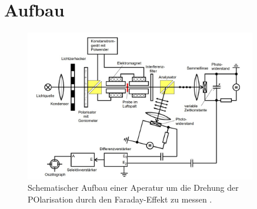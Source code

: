 \section{Aufbau}

\begin{figure}
    \centering
    \includegraphics[width=0.9\textwidth]{bilder/Aufbau.png}
    \caption{Schematischer Aufbau einer Aperatur um die Drehung der POlarisation durch den Faraday-Effekt zu messen \cite{skript}.}
    \label{fig:aufbau}
\end{figure}

